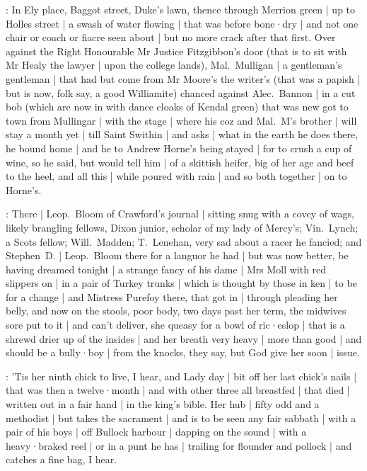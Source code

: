 :
In Ely place,
Baggot street,
Duke's lawn,
thence through Merrion green |
up to Holles street |
a swash of water flowing |
that was before bone·dry |
and not one chair or coach or fiacre seen about |
but no more crack after that first.
Over against the Right Honourable Mr Justice Fitzgibbon's door
(that is to sit with Mr Healy the lawyer |
upon the college lands),
Mal.~Mulligan |
a gentleman's gentleman |
that had but come from Mr Moore's the writer's
(that was a papish |
but is now,
folk say,
a good Williamite)
chanced against Alec.~Bannon |
in a cut bob
(which are now in with dance cloaks of Kendal green)
that was new got to town from Mullingar |
with the stage |
where his coz and Mal.~M's brother |
will stay a month yet |
till Saint Swithin |
and asks |
what in the earth he does there,
he bound home |
and he to Andrew Horne's being stayed |
for to crush a cup of wine,
so he said,
but would tell him |
of a skittish heifer,
big of her age and beef to the heel,
and all this |
while poured with rain |
and so both together |
on to Horne's.

:
There |
Leop.~Bloom of Crawford's journal |
sitting snug with a covey of wags,
likely brangling fellows,
Dixon junior,
scholar of my lady of Mercy's;
Vin.~Lynch;
a Scots fellow;
Will.~Madden;
T.~Lenehan,
very sad about a racer he fancied;
and Stephen~D. |
Leop.~Bloom there for a languor he had |
but was now better,
be having dreamed tonight |
a strange fancy of his dame |
Mrs Moll with red slippers on |
in a pair of Turkey trunks |
which is thought by those in ken |
to be for a change |
and Mistress Purefoy there,
that got in |
through pleading her belly,
and now on the stools,
poor body,
two days past her term,
the midwives sore put to it |
and can't deliver,
she queasy for a bowl of ric·eslop |
that is a shrewd drier up of the insides |
and her breath very heavy |
more than good |
and should be a bully·boy |
from the knocks,
they say,
but God give her soon |
issue.

:
'Tis her ninth chick to live,
I hear,
and Lady day |
bit off her last chick's nails |
that was then a twelve·month |
and with other three all breastfed |
that died |
written out in a fair hand |
in the king's bible.
Her hub |
fifty odd and a methodist |
but takes the sacrament |
and is to be seen any fair sabbath |
with a pair of his boys |
off Bullock harbour |
dapping on the sound |
with a heavy·braked reel |
or in a punt he has |
trailing for flounder and pollock |
and catches a fine bag,
I hear.

